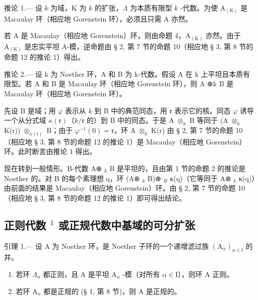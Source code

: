 推论 1.--- 设 \(k\) 为域，K 为 \(k\) 的扩张，\(\Lambda\) 为本质有限型 \(k\) -代数。为使 \(\mathrm{A}_{(\mathrm{K})}\) 是 Macaulay 环（相应地 Gorenstein 环），必须且只需 A 亦然。

若 A 是 Macaulay（相应地 Gorenstein）环，则由命题 4，\(\mathrm{A}_{(\mathrm{K})}\) 亦然。由于 \(\mathrm{A}_{(\mathrm{K})}\) 是忠实平坦 A-模，逆命题由 § 2, 第 7 节的命题 10（相应地 § 3, 第 8 节的命题 12 的推论 1）得出。

推论 2.--- 设 k 为 Noether 环，A 和 B 为 k-代数。假设 A 在 k 上平坦且本质有限型。若 A 和 B 是 Macaulay 环（相应地 Gorenstein 环），则 A ⊗k B 是 Macaulay 环（相应地 Gorenstein 环）。

先设 B 是域；用 \(\varphi\) 表示从 \(k\) 到 B 中的典范同态，用 \(\mathfrak{r}\) 表示它的核。同态 \(\varphi\) 诱导一个从分式域 \(\kappa(\mathfrak{r})\)（\(k/\mathfrak{r}\) 的）到 B 中的同态。于是 A \(\otimes_{k}\) B 等同于 (A \(\otimes_{k}\) K(r)) \(\otimes_{\kappa(\mathfrak{r})}\) B；由于 \(\varphi^{-1}(0)=\mathfrak{r}\)，环 A \(\otimes_{k}\) K(r) 由 § 2, 第 7 节的命题 10（相应地 § 3, 第 8 节的命题 12 的推论 1）是 Macaulay（相应地 Gorenstein）环。此时断言由推论 1 得出。

现在转到一般情形。B-代数 A⊗ \(_{k}\) B 是平坦的，且由第 1 节的命题 2 的推论是 Noether 的。对 B 的每个素理想 q，环 (A⊗ \(_{k}\) B)⊗ \(_{B}\) κ(q)（它等同于 A⊗ \(_{k}\) κ(q)）由前面的结果是 Macaulay（相应地 Gorenstein）环。由 § 2, 第 7 节的命题 10（相应地 § 3, 第 8 节的命题 12 的推论 1）即可得出结论。

\subsection{\texorpdfstring{正则代数 \(^{1}\) 或正规代数中基域的可分扩张}{正则代数或正规代数中基域的可分扩张（1）}}

引理 1.--- 设 A 为 Noether 环，是 Noether 子环的一个递增滤过族 \((\mathrm{A}_{\alpha})_{\alpha\in\mathbb{I}}\) 的并。

\begin{enumerate}
\def\labelenumi{\alph{enumi})}
\item
  若环 \(\Lambda_{\alpha}\) 都正则，且 A 是平坦 \(\mathrm{A}_{\alpha}\) -模（对所有 \(\alpha \in \mathrm{I}\)），则环 A 正则。
\item
  若环 \(\mathrm{A}_{\alpha}\) 都是正规的 (§ 1, 第 8 节)，则 A 是正规的。
\end{enumerate}


